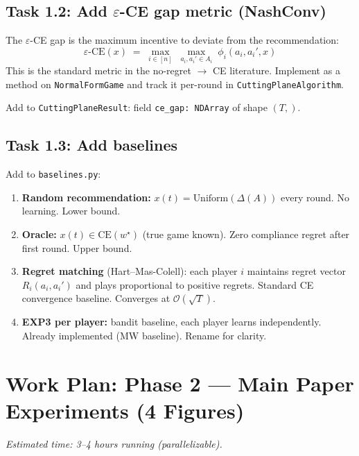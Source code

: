\documentclass[11pt]{article}
\newcommand{\bigO}{\mathcal{O}}
\newcommand{\CE}{\mathrm{CE}}
\begin{document}
\subsection{Task 1.2: Add $\varepsilon$-CE gap metric (NashConv)}

The $\varepsilon$-CE gap is the maximum incentive to deviate from the recommendation:
\[
\varepsilon\text{-CE}(x) \;=\; \max_{i \in [n]} \;\max_{a_i, a_i' \in A_i} \;\phi_i(a_i, a_i', x)
\]
This is the standard metric in the no-regret $\to$ CE literature. Implement as a method on \texttt{NormalFormGame} and track it per-round in \texttt{CuttingPlaneAlgorithm}.

Add to \texttt{CuttingPlaneResult}: field \texttt{ce\_gap: NDArray} of shape $(T,)$.

\subsection{Task 1.3: Add baselines}

Add to \texttt{baselines.py}:

\begin{enumerate}[nosep]
    \item \textbf{Random recommendation:} $x(t) = \text{Uniform}(\Delta(A))$ every round. No learning. Lower bound.

    \item \textbf{Oracle:} $x(t) \in \CE(w^\star)$ (true game known). Zero compliance regret after first round. Upper bound.

    \item \textbf{Regret matching} (Hart--Mas-Colell): each player $i$ maintains regret vector $R_i(a_i, a_i')$ and plays proportional to positive regrets. Standard CE convergence baseline. Converges at $\bigO(\sqrt{T})$.

    \item \textbf{EXP3 per player:} bandit baseline, each player learns independently. Already implemented (MW baseline). Rename for clarity.
\end{enumerate}

\section{Work Plan: Phase 2 --- Main Paper Experiments (4 Figures)}

\textit{Estimated time: 3--4 hours running (parallelizable).}
\end{document}
